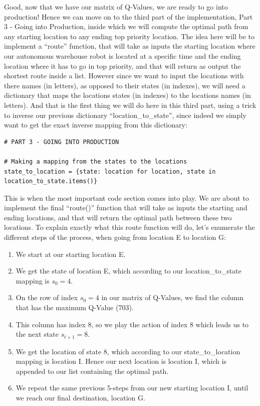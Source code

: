\documentclass[]{book}
\begin{document}
Good, now that we have our matrix of Q-Values, we are ready to go into production! Hence we can move on to the third part of the implementation, Part 3 - Going into Production, inside which we will compute the optimal path from any starting location to any ending top priority location. The idea here will be to implement a ``route'' function, that will take as inputs the starting location where our autonomous warehouse robot is located at a specific time and the ending location where it has to go in top priority, and that will return as output the shortest route inside a list. However since we want to input the locations with there names (in letters), as opposed to their states (in indexes), we will need a dictionary that maps the locations states (in indexes) to the locations names (in letters). And that is the first thing we will do here in this third part, using a trick to inverse our previous dictionary ``location\_to\_state'', since indeed we simply want to get the exact inverse mapping from this dictionary:

\begin{lstlisting}
# PART 3 - GOING INTO PRODUCTION

# Making a mapping from the states to the locations
state_to_location = {state: location for location, state in location_to_state.items()}
\end{lstlisting}

This is when the most important code section comes into play. We are about to implement the final ``route()'' function that will take as inputs the starting and ending locations, and that will return the optimal path between these two locations. To explain exactly what this route function will do, let's enumerate the different steps of the process, when going from location E to location G:

\begin{enumerate}
    \item We start at our starting location E.
    \item We get the state of location E, which according to our location\_to\_state mapping is $s_0 = 4$.
    \item On the row of index $s_0 = 4$ in our matrix of Q-Values, we find the column that has the maximum Q-Value (703).
    \item This column has index 8, so we play the action of index 8 which leads us to the next state $s_{t+1} = 8$.
    \item We get the location of state 8, which according to our state\_to\_location mapping is location I. Hence our next location is location I, which is appended to our list containing the optimal path.
    \item We repeat the same previous 5-steps from our new starting location I, until we reach our final destination, location G.
\end{enumerate}
\end{document}
